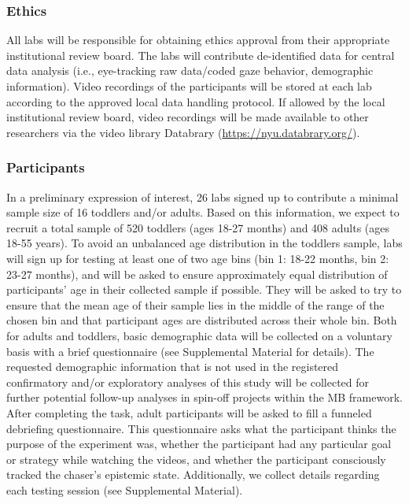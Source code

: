 \documentclass[
  man,floatsintext]{apa6}
\begin{document}
\subsubsection{Ethics}\label{ethics}

All labs will be responsible for obtaining ethics approval from their appropriate institutional review board. The labs will contribute de-identified data for central data analysis (i.e., eye-tracking raw data/coded gaze behavior, demographic information). Video recordings of the participants will be stored at each lab according to the approved local data handling protocol. If allowed by the local institutional review board, video recordings will be made available to other researchers via the video library Databrary (\url{https://nyu.databrary.org/}).

\subsubsection{Participants}\label{participants}

In a preliminary expression of interest, 26 labs signed up to contribute a minimal sample size of 16 toddlers and/or adults. Based on this information, we expect to recruit a total sample of 520 toddlers (ages 18-27 months) and 408 adults (ages 18-55 years). To avoid an unbalanced age distribution in the toddlers sample, labs will sign up for testing at least one of two age bins (bin 1: 18-22 months, bin 2: 23-27 months), and will be asked to ensure approximately equal distribution of participants' age in their collected sample if possible. They will be asked to try to ensure that the mean age of their sample lies in the middle of the range of the chosen bin and that participant ages are distributed across their whole bin. Both for adults and toddlers, basic demographic data will be collected on a voluntary basis with a brief questionnaire (see Supplemental Material for details). The requested demographic information that is not used in the registered confirmatory and/or exploratory analyses of this study will be collected for further potential follow-up analyses in spin-off projects within the MB framework.
After completing the task, adult participants will be asked to fill a funneled debriefing questionnaire. This questionnaire asks what the participant thinks the purpose of the experiment was, whether the participant had any particular goal or strategy while watching the videos, and whether the participant consciously tracked the chaser's epistemic state. Additionally, we collect details regarding each testing session (see Supplemental Material).
\end{document}
